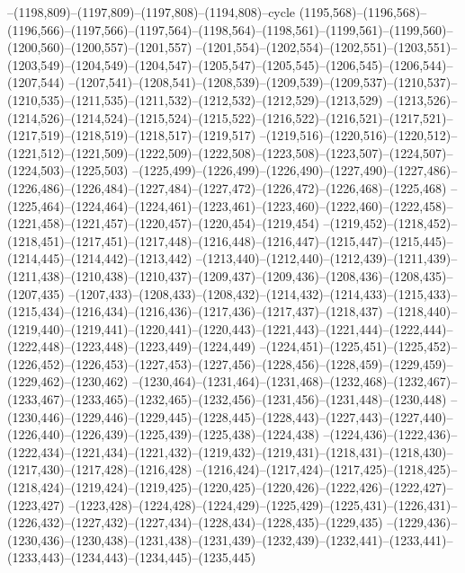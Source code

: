 --(1198,809)--(1197,809)--(1197,808)--(1194,808)--cycle
(1195,568)--(1196,568)--(1196,566)--(1197,566)--(1197,564)--(1198,564)--(1198,561)--(1199,561)--(1199,560)--(1200,560)--(1200,557)--(1201,557)
--(1201,554)--(1202,554)--(1202,551)--(1203,551)--(1203,549)--(1204,549)--(1204,547)--(1205,547)--(1205,545)--(1206,545)--(1206,544)--(1207,544)
--(1207,541)--(1208,541)--(1208,539)--(1209,539)--(1209,537)--(1210,537)--(1210,535)--(1211,535)--(1211,532)--(1212,532)--(1212,529)--(1213,529)
--(1213,526)--(1214,526)--(1214,524)--(1215,524)--(1215,522)--(1216,522)--(1216,521)--(1217,521)--(1217,519)--(1218,519)--(1218,517)--(1219,517)
--(1219,516)--(1220,516)--(1220,512)--(1221,512)--(1221,509)--(1222,509)--(1222,508)--(1223,508)--(1223,507)--(1224,507)--(1224,503)--(1225,503)
--(1225,499)--(1226,499)--(1226,490)--(1227,490)--(1227,486)--(1226,486)--(1226,484)--(1227,484)--(1227,472)--(1226,472)--(1226,468)--(1225,468)
--(1225,464)--(1224,464)--(1224,461)--(1223,461)--(1223,460)--(1222,460)--(1222,458)--(1221,458)--(1221,457)--(1220,457)--(1220,454)--(1219,454)
--(1219,452)--(1218,452)--(1218,451)--(1217,451)--(1217,448)--(1216,448)--(1216,447)--(1215,447)--(1215,445)--(1214,445)--(1214,442)--(1213,442)
--(1213,440)--(1212,440)--(1212,439)--(1211,439)--(1211,438)--(1210,438)--(1210,437)--(1209,437)--(1209,436)--(1208,436)--(1208,435)--(1207,435)
--(1207,433)--(1208,433)--(1208,432)--(1214,432)--(1214,433)--(1215,433)--(1215,434)--(1216,434)--(1216,436)--(1217,436)--(1217,437)--(1218,437)
--(1218,440)--(1219,440)--(1219,441)--(1220,441)--(1220,443)--(1221,443)--(1221,444)--(1222,444)--(1222,448)--(1223,448)--(1223,449)--(1224,449)
--(1224,451)--(1225,451)--(1225,452)--(1226,452)--(1226,453)--(1227,453)--(1227,456)--(1228,456)--(1228,459)--(1229,459)--(1229,462)--(1230,462)
--(1230,464)--(1231,464)--(1231,468)--(1232,468)--(1232,467)--(1233,467)--(1233,465)--(1232,465)--(1232,456)--(1231,456)--(1231,448)--(1230,448)
--(1230,446)--(1229,446)--(1229,445)--(1228,445)--(1228,443)--(1227,443)--(1227,440)--(1226,440)--(1226,439)--(1225,439)--(1225,438)--(1224,438)
--(1224,436)--(1222,436)--(1222,434)--(1221,434)--(1221,432)--(1219,432)--(1219,431)--(1218,431)--(1218,430)--(1217,430)--(1217,428)--(1216,428)
--(1216,424)--(1217,424)--(1217,425)--(1218,425)--(1218,424)--(1219,424)--(1219,425)--(1220,425)--(1220,426)--(1222,426)--(1222,427)--(1223,427)
--(1223,428)--(1224,428)--(1224,429)--(1225,429)--(1225,431)--(1226,431)--(1226,432)--(1227,432)--(1227,434)--(1228,434)--(1228,435)--(1229,435)
--(1229,436)--(1230,436)--(1230,438)--(1231,438)--(1231,439)--(1232,439)--(1232,441)--(1233,441)--(1233,443)--(1234,443)--(1234,445)--(1235,445)
